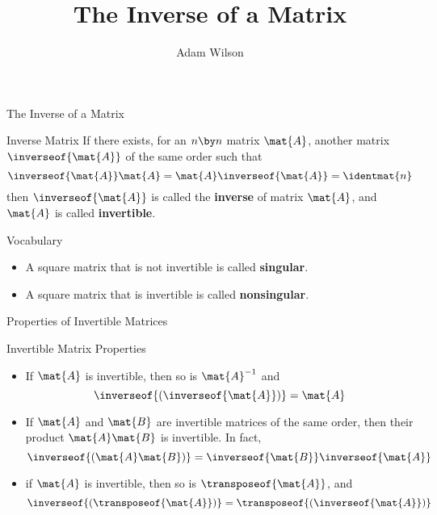 \documentclass{beamer}
\title[MATH 2250 - Section 3.3]{The Inverse of a Matrix}
\author{Adam Wilson}
\institute{Salt Lake Community College}
\date{}
\begin{document}
\begin{frame}
  \titlepage
\end{frame}

\begin{frame}{The Inverse of a Matrix}
\begin{block}{Inverse Matrix}
If there exists, for an $n \by n$ matrix $\mat{A}$, another matrix $\inverseof{\mat{A}}$ of the same order such that
\begin{equation*}
\inverseof{\mat{A}}\mat{A}=\mat{A}\inverseof{\mat{A}}=\identmat{n}
\end{equation*}
then $\inverseof{\mat{A}}$ is called the \textbf{inverse} of matrix $\mat{A}$, and $\mat{A}$ is called \textbf{invertible}.
\end{block}\pause
\begin{block}{Vocabulary}
\begin{itemize}
\item A square matrix that is not invertible is called \textbf{singular}.
\item A square matrix that is invertible is called \textbf{nonsingular}.
\end{itemize}
\end{block}
\end{frame}

\begin{frame}{Properties of Invertible Matrices}
\begin{block}{Invertible Matrix Properties}
\begin{itemize}
\item<+-> If $\mat{A}$ is invertible, then so is $\mat{A}^{-1}$ and 
\begin{equation*}
\inverseof{\left(\inverseof{\mat{A}}\right)}=\mat{A}
\end{equation*}
\item<+-> If $\mat{A}$ and $\mat{B}$ are invertible matrices of the same order, then their product $\mat{A}\mat{B}$ is invertible. In fact,
\begin{equation*}
\inverseof{\left(\mat{A}\mat{B}\right)}=\inverseof{\mat{B}}\inverseof{\mat{A}}
\end{equation*}
\item<+-> if $\mat{A}$ is invertible, then so is $\transposeof{\mat{A}}$, and
\begin{equation*}
\inverseof{\left(\transposeof{\mat{A}}\right)}=\transposeof{\left(\inverseof{\mat{A}}\right)}
\end{equation*}
\end{itemize}
\end{block}
\end{frame}
\end{document}
